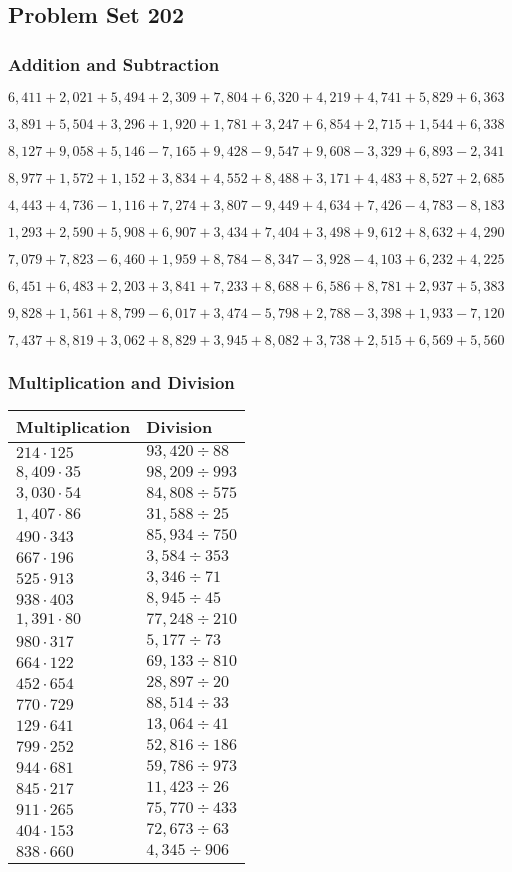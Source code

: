 \hypertarget{problem-set-202}{%
\subsection{Problem Set 202}\label{problem-set-202}}

\hypertarget{addition-and-subtraction}{%
\subsubsection{Addition and
Subtraction}\label{addition-and-subtraction}}

\(6,411+2,021+5,494+2,309+7,804+6,320+4,219+4,741+5,829+6,363\)

\(3,891+5,504+3,296+1,920+1,781+3,247+6,854+2,715+1,544+6,338\)

\(8,127+9,058+5,146-7,165+9,428-9,547+9,608-3,329+6,893-2,341\)

\(8,977+1,572+1,152+3,834+4,552+8,488+3,171+4,483+8,527+2,685\)

\(4,443+4,736-1,116+7,274+3,807-9,449+4,634+7,426-4,783-8,183\)

\(1,293+2,590+5,908+6,907+3,434+7,404+3,498+9,612+8,632+4,290\)

\(7,079+7,823-6,460+1,959+8,784-8,347-3,928-4,103+6,232+4,225\)

\(6,451+6,483+2,203+3,841+7,233+8,688+6,586+8,781+2,937+5,383\)

\(9,828+1,561+8,799-6,017+3,474-5,798+2,788-3,398+1,933-7,120\)

\(7,437+8,819+3,062+8,829+3,945+8,082+3,738+2,515+6,569+5,560\)

\hypertarget{multiplication-and-division}{%
\subsubsection{Multiplication and
Division}\label{multiplication-and-division}}

\begin{longtable}[]{@{}ll@{}}
\toprule
Multiplication & Division\tabularnewline
\midrule
\endhead
\(214\cdot125\) & \(93,420÷88\)\tabularnewline
\(8,409\cdot35\) & \(98,209÷993\)\tabularnewline
\(3,030\cdot54\) & \(84,808÷575\)\tabularnewline
\(1,407\cdot86\) & \(31,588÷25\)\tabularnewline
\(490\cdot343\) & \(85,934÷750\)\tabularnewline
\(667\cdot196\) & \(3,584÷353\)\tabularnewline
\(525\cdot913\) & \(3,346÷71\)\tabularnewline
\(938\cdot403\) & \(8,945÷45\)\tabularnewline
\(1,391\cdot80\) & \(77,248÷210\)\tabularnewline
\(980\cdot317\) & \(5,177÷73\)\tabularnewline
\(664\cdot122\) & \(69,133÷810\)\tabularnewline
\(452\cdot654\) & \(28,897÷20\)\tabularnewline
\(770\cdot729\) & \(88,514÷33\)\tabularnewline
\(129\cdot641\) & \(13,064÷41\)\tabularnewline
\(799\cdot252\) & \(52,816÷186\)\tabularnewline
\(944\cdot681\) & \(59,786÷973\)\tabularnewline
\(845\cdot217\) & \(11,423÷26\)\tabularnewline
\(911\cdot265\) & \(75,770÷433\)\tabularnewline
\(404\cdot153\) & \(72,673÷63\)\tabularnewline
\(838\cdot660\) & \(4,345÷906\)\tabularnewline
\bottomrule
\end{longtable}
